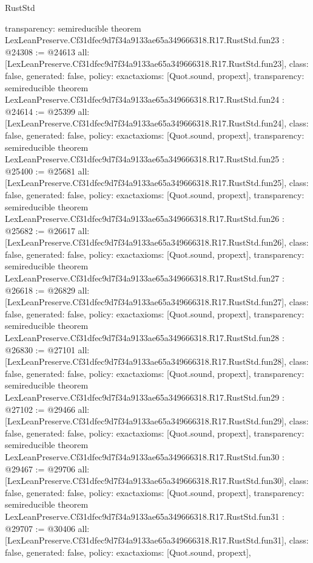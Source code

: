 \begin{lexlean}{RustStd}
\begin{coremodule}
{  transparency: semireducible
}
theorem LexLeanPreserve.Cf31dfec9d7f34a9133ae65a349666318.R17.RustStd.fun23 : @24308 := @24613 {
  all: [LexLeanPreserve.Cf31dfec9d7f34a9133ae65a349666318.R17.RustStd.fun23],
  class: false,
  generated: false,
  policy: exact{axioms: [Quot.sound, propext]},
  transparency: semireducible
}
theorem LexLeanPreserve.Cf31dfec9d7f34a9133ae65a349666318.R17.RustStd.fun24 : @24614 := @25399 {
  all: [LexLeanPreserve.Cf31dfec9d7f34a9133ae65a349666318.R17.RustStd.fun24],
  class: false,
  generated: false,
  policy: exact{axioms: [Quot.sound, propext]},
  transparency: semireducible
}
theorem LexLeanPreserve.Cf31dfec9d7f34a9133ae65a349666318.R17.RustStd.fun25 : @25400 := @25681 {
  all: [LexLeanPreserve.Cf31dfec9d7f34a9133ae65a349666318.R17.RustStd.fun25],
  class: false,
  generated: false,
  policy: exact{axioms: [Quot.sound, propext]},
  transparency: semireducible
}
theorem LexLeanPreserve.Cf31dfec9d7f34a9133ae65a349666318.R17.RustStd.fun26 : @25682 := @26617 {
  all: [LexLeanPreserve.Cf31dfec9d7f34a9133ae65a349666318.R17.RustStd.fun26],
  class: false,
  generated: false,
  policy: exact{axioms: [Quot.sound, propext]},
  transparency: semireducible
}
theorem LexLeanPreserve.Cf31dfec9d7f34a9133ae65a349666318.R17.RustStd.fun27 : @26618 := @26829 {
  all: [LexLeanPreserve.Cf31dfec9d7f34a9133ae65a349666318.R17.RustStd.fun27],
  class: false,
  generated: false,
  policy: exact{axioms: [Quot.sound, propext]},
  transparency: semireducible
}
theorem LexLeanPreserve.Cf31dfec9d7f34a9133ae65a349666318.R17.RustStd.fun28 : @26830 := @27101 {
  all: [LexLeanPreserve.Cf31dfec9d7f34a9133ae65a349666318.R17.RustStd.fun28],
  class: false,
  generated: false,
  policy: exact{axioms: [Quot.sound, propext]},
  transparency: semireducible
}
theorem LexLeanPreserve.Cf31dfec9d7f34a9133ae65a349666318.R17.RustStd.fun29 : @27102 := @29466 {
  all: [LexLeanPreserve.Cf31dfec9d7f34a9133ae65a349666318.R17.RustStd.fun29],
  class: false,
  generated: false,
  policy: exact{axioms: [Quot.sound, propext]},
  transparency: semireducible
}
theorem LexLeanPreserve.Cf31dfec9d7f34a9133ae65a349666318.R17.RustStd.fun30 : @29467 := @29706 {
  all: [LexLeanPreserve.Cf31dfec9d7f34a9133ae65a349666318.R17.RustStd.fun30],
  class: false,
  generated: false,
  policy: exact{axioms: [Quot.sound, propext]},
  transparency: semireducible
}
theorem LexLeanPreserve.Cf31dfec9d7f34a9133ae65a349666318.R17.RustStd.fun31 : @29707 := @30406 {
  all: [LexLeanPreserve.Cf31dfec9d7f34a9133ae65a349666318.R17.RustStd.fun31],
  class: false,
  generated: false,
  policy: exact{axioms: [Quot.sound, propext]},
}
\end{coremodule}
\end{lexlean}
